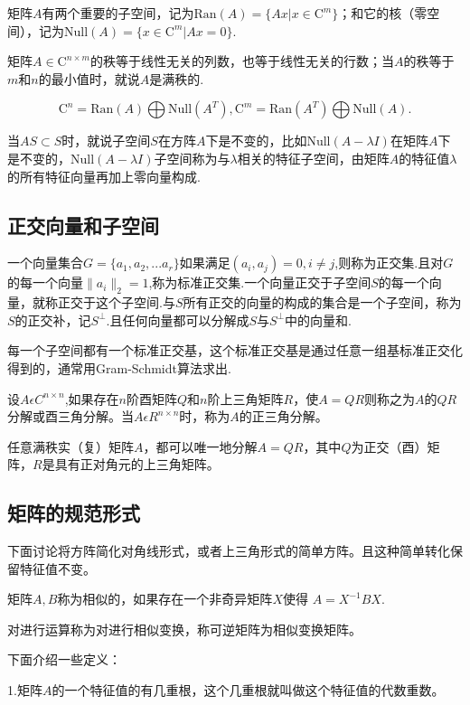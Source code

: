 \documentclass{article}
\newcommand{\Null}{\text{Null}}
\newcommand{\Ran}{\text{Ran}}
\begin{document}
矩阵$A$有两个重要的子空间，记为$ \Ran(A)=\lbrace Ax|x\in\mathrm{C}^m\rbrace$；和它的核（零空间），记为$ \Null(A)=\lbrace x\in\mathrm{C}^m|Ax=0\rbrace$.
 
矩阵$A\in\mathrm{C}^{n\times m}$的秩等于线性无关的列数，也等于线性无关的行数；当$A$的秩等于$m$和$n$的最小值时，就说$A$是满秩的.

$$\mathrm{C}^n=\Ran(A)\bigoplus \Null(A^T),\mathrm{C}^m=\Ran(A^T)\bigoplus \Null(A).$$

当$AS\subset S$时，就说子空间$S$在方阵$A$下是不变的，比如$ \Null(A-\lambda I)$在矩阵$A$下是不变的，$ \Null(A-\lambda I)$子空间称为与$\lambda$相关的特征子空间，由矩阵$A$的特征值$\lambda$的所有特征向量再加上零向量构成.


\subsection{正交向量和子空间}
一个向量集合$G=\lbrace a_1,a_2,...a_r\rbrace$如果满足$(a_i,a_j)=0,i\neq j$,则称为正交集.且对$G$的每一个向量$\parallel a_i \parallel_2=1$,称为标准正交集.一个向量正交于子空间$S$的每一个向量，就称正交于这个子空间.与$S$所有正交的向量的构成的集合是一个子空间，称为$S$的正交补，记$S^\perp$.且任何向量都可以分解成$S$与$S^\perp$中的向量和.

每一个子空间都有一个标准正交基，这个标准正交基是通过任意一组基标准正交化得到的，通常用Gram-Schmidt算法求出.

\begin{definition}
设$A\epsilon C^{n\times n}$,如果存在$n$阶酉矩阵$Q$和$n$阶上三角矩阵$R$，使$A=QR$则称之为$A$的$QR$分解或酉三角分解。当$A\epsilon R^{n\times n}$时，称为$A$的正三角分解。
\end{definition}

任意满秩实（复）矩阵$A$，都可以唯一地分解$A=QR$，其中$Q$为正交（酉）矩阵，$R$是具有正对角元的上三角矩阵。
\subsection{矩阵的规范形式}
下面讨论将方阵简化对角线形式，或者上三角形式的简单方阵。且这种简单转化保留特征值不变。

\begin{definition}
矩阵$A,B$称为相似的，如果存在一个非奇异矩阵$X$使得   $A=X^{-1}BX.$  
\end{definition}

对进行运算称为对进行相似变换，称可逆矩阵为相似变换矩阵。

下面介绍一些定义：

1.矩阵$A$的一个特征值的有几重根，这个几重根就叫做这个特征值的代数重数。
\end{document}
